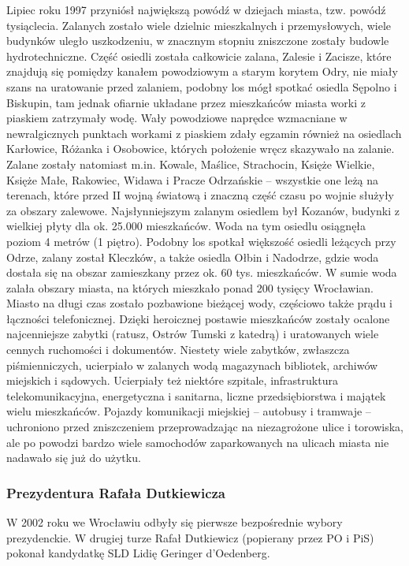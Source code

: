 \documentclass{article}
\let\footnote=\endnote
\begin{document}
Lipiec roku 1997 przyniósł największą powódź w dziejach miasta, tzw. powódź tysiąclecia. Zalanych zostało wiele dzielnic mieszkalnych i przemysłowych, wiele budynków uległo uszkodzeniu, w znacznym stopniu zniszczone zostały budowle hydrotechniczne. Część osiedli została całkowicie zalana, Zalesie i Zacisze, które znajdują się pomiędzy kanałem powodziowym a starym korytem Odry, nie miały szans na uratowanie przed zalaniem, podobny los mógł spotkać osiedla Sępolno i Biskupin, tam jednak ofiarnie układane przez mieszkańców miasta worki z piaskiem zatrzymały wodę. Wały powodziowe naprędce wzmacniane w newralgicznych punktach workami z piaskiem zdały egzamin również na osiedlach Karłowice, Różanka i Osobowice, których położenie wręcz skazywało na zalanie. Zalane zostały natomiast m.in. Kowale, Maślice, Strachocin, Księże Wielkie, Księże Małe, Rakowiec, Widawa i Pracze Odrzańskie – wszystkie one leżą na terenach, które przed II wojną światową i znaczną część czasu po wojnie służyły za obszary zalewowe. Najsłynniejszym zalanym osiedlem był Kozanów, budynki z wielkiej płyty dla ok. 25.000 mieszkańców. Woda na tym osiedlu osiągnęła poziom 4 metrów (1 piętro). Podobny los spotkał większość osiedli leżących przy Odrze, zalany został Kleczków, a także osiedla Ołbin i Nadodrze, gdzie woda dostała się na obszar zamieszkany przez ok. 60 tys. mieszkańców. W sumie woda zalała obszary miasta, na których mieszkało ponad 200 tysięcy Wrocławian. Miasto na długi czas zostało pozbawione bieżącej wody, częściowo także prądu i łączności telefonicznej. Dzięki heroicznej postawie mieszkańców zostały ocalone najcenniejsze zabytki (ratusz, Ostrów Tumski z katedrą) i uratowanych wiele cennych ruchomości i dokumentów. Niestety wiele zabytków, zwłaszcza piśmienniczych, ucierpiało w zalanych wodą magazynach bibliotek, archiwów miejskich i sądowych. Ucierpiały też niektóre szpitale, infrastruktura telekomunikacyjna, energetyczna i sanitarna, liczne przedsiębiorstwa i majątek wielu mieszkańców. Pojazdy komunikacji miejskiej – autobusy i tramwaje – uchroniono przed zniszczeniem przeprowadzając na niezagrożone ulice i torowiska, ale po powodzi bardzo wiele samochodów zaparkowanych na ulicach miasta nie nadawało się już do użytku.
\subsubsection{Prezydentura Rafała Dutkiewicza}
W 2002 roku we Wrocławiu odbyły się pierwsze bezpośrednie wybory prezydenckie. W drugiej turze Rafał Dutkiewicz (popierany przez PO i PiS) pokonał kandydatkę SLD Lidię Geringer d’Oedenberg\footnote{wyniki I tury.}\footnote{wyniki II tury.}.
\end{document}

